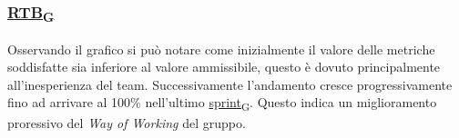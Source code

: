 \subsubsection*{\href{https://7last.github.io/docs/rtb/documentazione-interna/glossario\#requirements-and-technology-baseline}{RTB\textsubscript{G}}}
Osservando il grafico si può notare come inizialmente il valore delle metriche soddisfatte sia inferiore al valore ammissibile, questo è dovuto principalmente all'inesperienza del team. Successivamente l'andamento cresce progressivamente fino ad arrivare al 100\% nell'ultimo \href{https://7last.github.io/docs/rtb/documentazione-interna/glossario\#sprint}{sprint\textsubscript{G}}. Questo indica un miglioramento proressivo del \textit{Way of Working} del gruppo.



